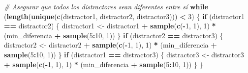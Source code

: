 \documentclass[
]{article}
\newenvironment{Shaded}{\begin{snugshade}}{\end{snugshade}}
\newcommand{\CommentTok}[1]{\textcolor[rgb]{0.56,0.35,0.01}{\textit{#1}}}
\newcommand{\ControlFlowTok}[1]{\textcolor[rgb]{0.13,0.29,0.53}{\textbf{#1}}}
\newcommand{\DecValTok}[1]{\textcolor[rgb]{0.00,0.00,0.81}{#1}}
\newcommand{\FunctionTok}[1]{\textcolor[rgb]{0.13,0.29,0.53}{\textbf{#1}}}
\newcommand{\NormalTok}[1]{#1}
\newcommand{\OtherTok}[1]{\textcolor[rgb]{0.56,0.35,0.01}{#1}}
\newcommand{\SpecialCharTok}[1]{\textcolor[rgb]{0.81,0.36,0.00}{\textbf{#1}}}
\begin{document}
\begin{Shaded}
\begin{Highlighting}[]
\CommentTok{\# Asegurar que todos los distractores sean diferentes entre sí}
\ControlFlowTok{while}\NormalTok{ (}\FunctionTok{length}\NormalTok{(}\FunctionTok{unique}\NormalTok{(}\FunctionTok{c}\NormalTok{(distractor1, distractor2, distractor3))) }\SpecialCharTok{\textless{}} \DecValTok{3}\NormalTok{) \{}
  \ControlFlowTok{if}\NormalTok{ (distractor1 }\SpecialCharTok{==}\NormalTok{ distractor2) \{}
\NormalTok{    distractor1 }\OtherTok{\textless{}{-}}\NormalTok{ distractor1 }\SpecialCharTok{+} \FunctionTok{sample}\NormalTok{(}\FunctionTok{c}\NormalTok{(}\SpecialCharTok{{-}}\DecValTok{1}\NormalTok{, }\DecValTok{1}\NormalTok{), }\DecValTok{1}\NormalTok{) }\SpecialCharTok{*}\NormalTok{ (min\_diferencia }\SpecialCharTok{+} \FunctionTok{sample}\NormalTok{(}\DecValTok{5}\SpecialCharTok{:}\DecValTok{10}\NormalTok{, }\DecValTok{1}\NormalTok{))}
\NormalTok{  \}}
  \ControlFlowTok{if}\NormalTok{ (distractor2 }\SpecialCharTok{==}\NormalTok{ distractor3) \{}
\NormalTok{    distractor2 }\OtherTok{\textless{}{-}}\NormalTok{ distractor2 }\SpecialCharTok{+} \FunctionTok{sample}\NormalTok{(}\FunctionTok{c}\NormalTok{(}\SpecialCharTok{{-}}\DecValTok{1}\NormalTok{, }\DecValTok{1}\NormalTok{), }\DecValTok{1}\NormalTok{) }\SpecialCharTok{*}\NormalTok{ (min\_diferencia }\SpecialCharTok{+} \FunctionTok{sample}\NormalTok{(}\DecValTok{5}\SpecialCharTok{:}\DecValTok{10}\NormalTok{, }\DecValTok{1}\NormalTok{))}
\NormalTok{  \}}
  \ControlFlowTok{if}\NormalTok{ (distractor1 }\SpecialCharTok{==}\NormalTok{ distractor3) \{}
\NormalTok{    distractor3 }\OtherTok{\textless{}{-}}\NormalTok{ distractor3 }\SpecialCharTok{+} \FunctionTok{sample}\NormalTok{(}\FunctionTok{c}\NormalTok{(}\SpecialCharTok{{-}}\DecValTok{1}\NormalTok{, }\DecValTok{1}\NormalTok{), }\DecValTok{1}\NormalTok{) }\SpecialCharTok{*}\NormalTok{ (min\_diferencia }\SpecialCharTok{+} \FunctionTok{sample}\NormalTok{(}\DecValTok{5}\SpecialCharTok{:}\DecValTok{10}\NormalTok{, }\DecValTok{1}\NormalTok{))}
\NormalTok{  \}}
\NormalTok{\}}


\end{Highlighting}
\end{Shaded}
\end{document}
